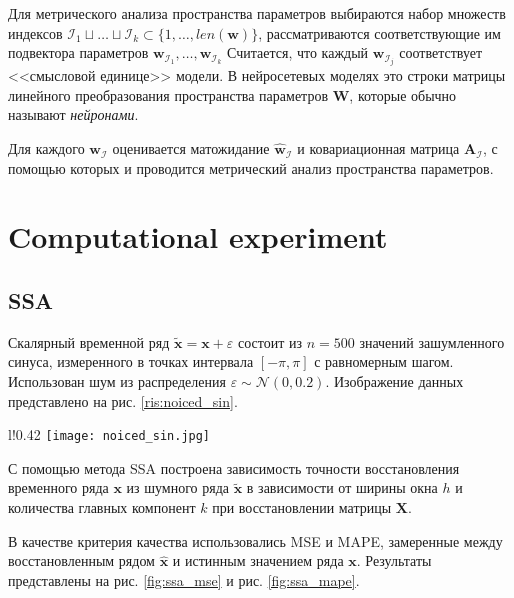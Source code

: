 \documentclass[12pt, twoside]{article}
\begin{document}
Для метрического анализа пространства параметров выбираются набор множеств индексов $\mathcal{I}_1 \sqcup \dots \sqcup \mathcal{I}_k \subset \{1, \dots, len(\mathbf{w})\}$, рассматриваются соответствующие им подвектора параметров $\mathbf{w}_{\mathcal{I}_1}, \dots, \mathbf{w}_{\mathcal{I}_k}$
Считается, что каждый $\mathbf{w}_{\mathcal{I}_j}$ соответствует <<смысловой единице>> модели. В нейросетевых моделях это строки матрицы линейного преобразования пространства параметров $\mathbf{W}$, которые обычно называют \textit{нейронами}.

Для каждого $\mathbf{w}_{\mathcal{I}}$ оценивается матожидание $\hat{\mathbf{w}}_{\mathcal{I}}$ и ковариационная матрица $\mathbf{A}_{\mathcal{I}}$, с помощью которых и проводится метрический анализ пространства параметров.


\section{Computational experiment}
\subsection{SSA}
Скалярный временной ряд $\mathbf{\tilde{x}} = \mathbf{x} + \varepsilon$ состоит из $n=500$ значений зашумленного синуса, измеренного в точках интервала $[-\pi, \pi]$ с равномерным шагом. Использован шум из распределения $\varepsilon \sim \mathcal{N}(0, 0.2)$. Изображение данных представлено на рис. \ref{ris:noiced_sin}.

\begin{wrapfigure}{l!}{0.42\textwidth}
\texttt{[image: noiced\_sin.jpg]}
\caption{Зашумленный синус.}
\label{ris:noiced_sin}
\end{wrapfigure}

С помощью метода SSA построена зависимость точности восстановления временного ряда $\mathbf{x}$ из шумного ряда $\mathbf{\tilde{x}}$ в зависимости от ширины окна $h$ и количества главных компонент $k$ при восстановлении матрицы $\mathbf{X}$.

В качестве критерия качества использовались MSE и MAPE, замеренные между восстановленным рядом $\mathbf{\hat{x}}$ и истинным значением ряда $\mathbf{x}$. Результаты представлены на рис. \ref{fig:ssa_mse} и рис. \ref{fig:ssa_mape}.

\captionsetup[subfigure]{labelsep=colon}
\end{document}
